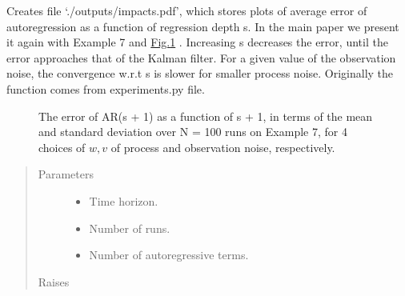 \documentclass[letterpaper,10pt,english]{sphinxmanual}
\begin{document}
\begin{fulllineitems}
\label{\detokenize{LDS:LDS.OnlineLDS_library.testImpactOfS}}
\sphinxAtStartPar
Creates file ‘./outputs/impacts.pdf’, which stores plots of average error of auto\sphinxhyphen{}regression
as a function of regression depth s. In the main paper we present it again with Example 7
and \hyperref[\detokenize{LDS:fig4}]{Fig.\@ \ref{\detokenize{LDS:fig4}}} .
Increasing s decreases the error, until the error approaches that of the Kalman filter.
For a given value of the observation noise, the convergence w.r.t s is slower for
smaller process noise.
Originally the function comes from experiments.py file.

\begin{figure}[htbp]
\centering
\capstart

\noindent{}
\caption{The error of AR(s + 1) as a function of s + 1, in terms of the mean
and standard deviation over N = 100 runs on Example 7, for 4 choices of \(w, v\)
of process and observation noise, respectively.}\label{\detokenize{LDS:id3}}\label{\detokenize{LDS:fig4}}\end{figure}
\begin{quote}\begin{description}
\item[{Parameters}] \leavevmode\begin{itemize}
\item {} 
\sphinxAtStartPar
{} \textendash{} Time horizon.

\item {} 
\sphinxAtStartPar
{} \textendash{} Number of runs.

\item {} 
\sphinxAtStartPar
{} \textendash{} Number of auto\sphinxhyphen{}regressive terms.

\end{itemize}

\item[{Raises}] \leavevmode
\sphinxAtStartPar
{} \textendash{} 

\end{description}\end{quote}

\end{fulllineitems}
\end{document}
